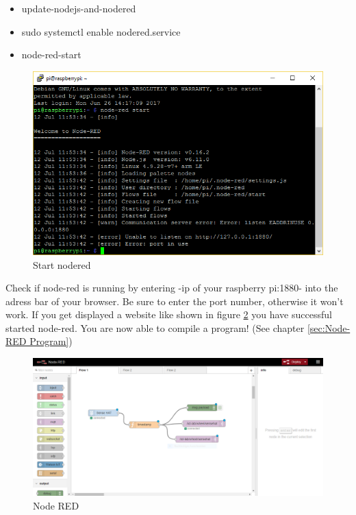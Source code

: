 \documentclass[12pt]{article}
\begin{document}
\begin{itemize}
	\item update-nodejs-and-nodered
	\item sudo systemctl enable nodered.service
	\item node-red-start
\end{itemize}

\begin{figure}[H]
    \includegraphics[width=1\textwidth]{putty_start_node_red.PNG}
    \centering
	\caption{Start nodered}
	\label{img:putty_start_node_red}
\end{figure}
Check if node-red is running by entering -ip of your raspberry pi:1880- into the adress bar of your browser. Be sure to enter the port number, otherwise it won't work. If you get displayed a website like shown in figure \ref{img:Node RED} you have successful started node-red. You are now able to compile a program! (See chapter \ref{sec:Node-RED Program})

\begin{figure}[H]
	\includegraphics[width=\textwidth]{Node_red_1.PNG}
	\caption{Node RED}
	\label{img:Node RED}
\end{figure}
\end{document}
